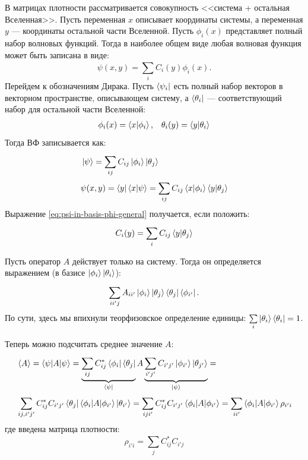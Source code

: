\begin{lecture}
В матрицах плотности рассматривается совокупность <<система + остальная Вселенная>>.
Пусть переменная $x$ описывает  координаты системы, а переменная $y$ --- координаты остальной части Вселенной. Пусть $\phi_i (x)$ представляет полный набор волновых функций. Тогда в наиболее общем виде любая волновая функция может быть записана в виде:
\begin{equation}
    \label{eq:psi-in-basis-phi-general}
    \psi (x, y) = \sum\limits_{i}^{} C_i (y) \phi_i (x).
\end{equation}
Перейдем к обозначениям Дирака. Пусть $\bra{\psi_i}$ есть полный набор векторов в векторном пространстве, описывающем систему, а $\bra{\theta_i}$ --- соответствующий набор для остальной части Вселенной:
\begin{align}
    & \phi_i (x) = \braket{x|\phi_i},
    & \theta_i (y) = \braket{y|\theta_i}
\end{align}
Тогда ВФ записывается как:
\begin{align}
    \label{eq:psi-in-basis-phi-theta-general}
    & \ket{\psi} = \sum^{}_{ij} C_{ij} \ket{\phi_i} \ket{\theta_j} \\
    & \psi (x, y) = \bra{y}\braket{x|\psi} = \sum^{}_{ij} C_{ij} \braket{x|\phi_i} \braket{y|\theta_j}
\end{align}
Выражение \eqref{eq:psi-in-basis-phi-general} получается, если положить:
\begin{equation}
    \label{eq:C_i-basis-definition}
    C_i (y) = \sum\limits_{i}^{} C_{ij} \braket{y|\theta_j}
\end{equation}

Пусть оператор $A$ действует только на систему.
Тогда он определяется выражением (в базисе $\ket{\phi_i}\ket{\theta_i}$):
\begin{equation}
    \label{eq:A-action-on-system-general}
    \sum\limits_{ii'j}^{} A_{ii'} \ket{\phi_i} \ket{\theta_j} \bra{\theta_j} \bra{\phi_{i'}}.
\end{equation}
По сути, здесь мы впихнули теорфизовское определение единицы: $\sum\limits_{i}^{} \ket{\theta_i} \bra{\theta_i} = 1$.

Теперь можно подсчитать среднее значение $A$:
\begin{align}
    \label{eq:A-mean-derivation}
    \nonumber
    & \braket{A} =
    \braket{\psi|A|\psi} =
    \underbrace{\sum\limits_{ij}^{} C_{ij}^* \bra{\phi_i}\bra{\theta_j}}_{\bra{\psi}}
    A
    \underbrace{\sum\limits_{i'j'}^{} C_{i'j'} \ket{\phi_{i'}} \ket{\theta_{j'}}}_{\ket{\psi}} = \\
    & \sum\limits_{ij, i'j'}^{} C_{ij}^{*} C_{i'j'} \bra{\theta_j} \braket{\phi_i|A|\phi_{i'}} \ket{\theta_{i'} } =
    \sum_{iji'}^{} C_{ij}^* C_{i'j'} \braket{\phi_i|A|\phi_{i'} } =
    \sum\limits_{ii'}^{} \braket{\phi_i|A|\phi_{i'} }    \rho_{i'i}
\end{align}
где введена матрица плотности:
\begin{equation}
    \label{eq:rho-definition-from-C}
    \rho_{i'i} = \sum\limits_{j}^{} C_{ij} ^{*} C_{i'j}
\end{equation}


\end{lecture}
